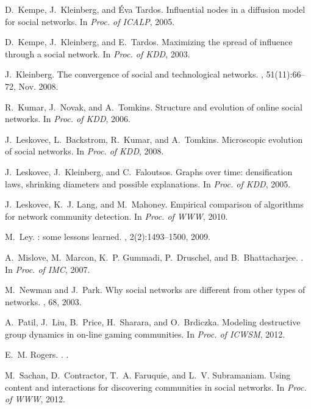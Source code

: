 \documentclass[letterpaper]{www13-companion-accepted}
\begin{document}
{\begin{thebibliography}{10}
D.~Kempe, J.~Kleinberg, and \'{E}va Tardos.
\newblock Influential nodes in a diffusion model for social networks.
\newblock In {\em Proc. of ICALP}, 2005.

D.~Kempe, J.~Kleinberg, and E.~Tardos.
\newblock Maximizing the spread of influence through a social network.
\newblock In {\em Proc. of KDD}, 2003.

\vfill\eject

J.~Kleinberg.
\newblock The convergence of social and technological networks.
, 51(11):66--72, Nov. 2008.

R.~Kumar, J.~Novak, and A.~Tomkins.
\newblock Structure and evolution of online social networks.
\newblock In {\em Proc. of KDD}, 2006.

J.~Leskovec, L.~Backstrom, R.~Kumar, and A.~Tomkins.
\newblock Microscopic evolution of social networks.
\newblock In {\em Proc. of KDD}, 2008.

J.~Leskovec, J.~Kleinberg, and C.~Faloutsos.
\newblock Graphs over time: densification laws, shrinking diameters and
  possible explanations.
\newblock In {\em Proc. of KDD}, 2005.

J.~Leskovec, K.~J. Lang, and M.~Mahoney.
\newblock Empirical comparison of algorithms for network community detection.
\newblock In {\em Proc. of WWW}, 2010.

M.~Ley.
: some lessons learned.
, 2(2):1493--1500, 2009.

A.~Mislove, M.~Marcon, K.~P. Gummadi, P.~Druschel, and B.~Bhattacharjee.
.
\newblock In {\em Proc. of IMC}, 2007.

M.~Newman and J.~Park.
\newblock Why social networks are different from other types of networks.
, 68, 2003.

A.~Patil, J.~Liu, B.~Price, H.~Sharara, and O.~Brdiczka.
\newblock Modeling destructive group dynamics in on-line gaming communities.
\newblock In {\em Proc. of ICWSM}, 2012.

E.~M. Rogers.
.
.

M.~Sachan, D.~Contractor, T.~A. Faruquie, and L.~V. Subramaniam.
\newblock Using content and interactions for discovering communities in social
  networks.
\newblock In {\em Proc. of WWW}, 2012.


\end{thebibliography}}
\end{document}
